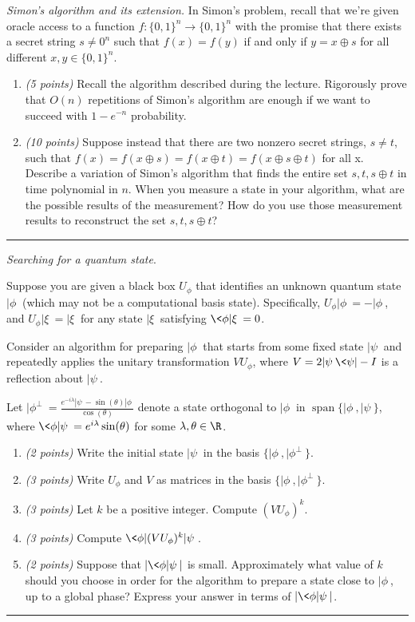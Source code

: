 \documentclass{article}
\newcommand{\shortbar}{\begin{center}\rule{5ex}{0.1pt}\end{center}}
\theoremstyle{plain}
\theoremstyle{definition}
\theoremstyle{remark}
\newenvironment{problem}[1]{\medskip\noindent{\bf Problem #1.~}}{\shortbar}
\newcommand{\spn}{\mathop{\mathrm{span}}}
\newcommand{\points}[1]{\textit{(#1 points)}}
\begin{document}
\begin{problem}{3} \emph{Simon's algorithm and its extension.}
In Simon's problem, recall that we're given oracle access to a
function $f : \{0, 1\}^n \rightarrow \{0, 1\}^n$ with the promise that there exists a secret string $s \neq 0^n$
such that $f(x) = f(y)$ if and only if $y = x \oplus s$ for all different $x, y\in \{0, 1\}^n$. 

\begin{enumerate}
   \item \points{5} Recall the algorithm described during the lecture. Rigorously prove that $O(n)$ repetitions of Simon's
algorithm are enough if we want to succeed with $1-e^{-n}$ probability.
   \item \points{10} Suppose instead that there are two nonzero secret strings, $s\neq t$, such that $f(x) =
f(x \oplus s) = f(x \oplus  t) = f(x \oplus s \oplus t)$ for all x. Describe a variation of Simon's algorithm
that finds the entire set $s, t, s\oplus t$ in time polynomial in $n$. When you measure a state in
your algorithm, what are the possible results of the measurement? How do you use those
measurement results to reconstruct the set $s, t, s\oplus t$?
\end{enumerate}
\end{problem}


\begin{problem}{4}
\emph{Searching for a quantum state}.

Suppose you are given a black box $U_\phi$ that identifies an unknown quantum state $|\phi\>$ (which may not be a computational basis state).  Specifically, $U_\phi |\phi\> = -|\phi\>$, and $U_\phi|\xi\>=|\xi\>$ for any state $|\xi\>$ satisfying $\<\phi|\xi\>=0$.

Consider an algorithm for preparing $|\phi\>$ that starts from some fixed state $|\psi\>$ and repeatedly applies the unitary transformation $VU_\phi$, where $V=2|\psi\>\<\psi|-I$ is a reflection about $|\psi\>$.

Let $|\phi^\perp\> = \frac{e^{-i\lambda}|\psi\> - \sin(\theta) |\phi\>}{\cos(\theta)}$ denote a state orthogonal to $|\phi\>$ in $\spn\{|\phi\>,|\psi\>\}$, where $\<\phi|\psi\> = e^{i\lambda} \sin(\theta)$ for some $\lambda,\theta \in \R$.

\begin{enumerate}
  \item \points{2} Write the initial state $|\psi\>$ in the basis $\{|\phi\>,|\phi^\perp\>\}$.
  \item \points{3} Write $U_\phi$ and $V$ as matrices in the basis $\{|\phi\>,|\phi^\perp\>\}$.
  \item \points{3} Let $k$ be a positive integer.  Compute $(VU_\phi)^k$. 
  \item \points{3} Compute $\<\phi|(VU_\phi)^k|\psi\>$.
  \item \points{2} Suppose that $|\<\phi|\psi\>|$ is small.  Approximately what value of $k$ should you choose in order for the algorithm to prepare a state close to $|\phi\>$, up to a global phase?  Express your answer in terms of $|\<\phi|\psi\>|$.
\end{enumerate}
\end{problem}
\end{document}
